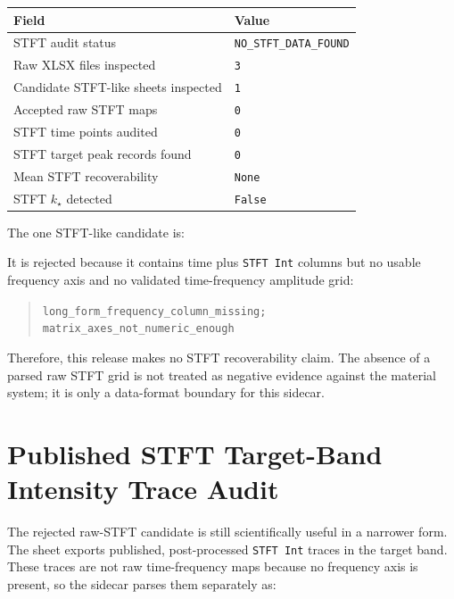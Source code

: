 \documentclass[11pt]{article}
\begin{document}
\begin{center}
\begin{tabular}{ll}
\toprule
Field & Value \\
\midrule
STFT audit status & \texttt{NO\_STFT\_DATA\_FOUND} \\
Raw XLSX files inspected & \texttt{3} \\
Candidate STFT-like sheets inspected & \texttt{1} \\
Accepted raw STFT maps & \texttt{0} \\
STFT time points audited & \texttt{0} \\
STFT target peak records found & \texttt{0} \\
Mean STFT recoverability & \texttt{None} \\
STFT \(k_\star\) detected & \texttt{False} \\
\bottomrule
\end{tabular}
\end{center}

The one STFT-like candidate is:

\begin{quote}
\end{quote}

It is rejected because it contains time plus \texttt{STFT Int} columns but no usable frequency axis and no validated time-frequency amplitude grid:

\begin{quote}
\texttt{long\_form\_frequency\_column\_missing; matrix\_axes\_not\_numeric\_enough}
\end{quote}

Therefore, this release makes no STFT recoverability claim. The absence of a parsed raw STFT grid is not treated as negative evidence against the material system; it is only a data-format boundary for this sidecar.

\section{Published STFT Target-Band Intensity Trace Audit}

The rejected raw-STFT candidate is still scientifically useful in a narrower
form. The sheet  exports published,
post-processed \texttt{STFT Int} traces in the target band. These traces are
not raw time-frequency maps because no frequency axis is present, so the sidecar
parses them separately as:
\end{document}

